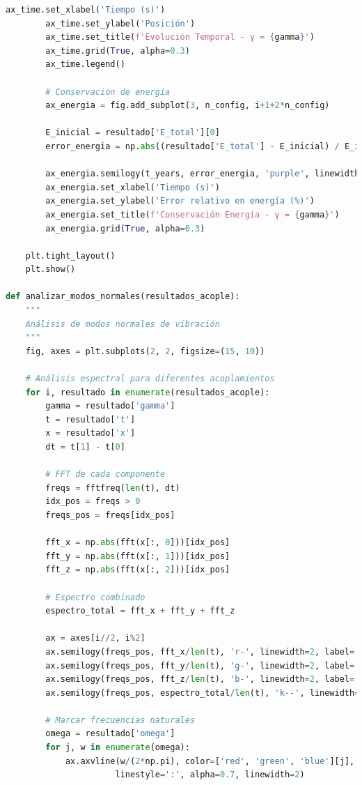 \documentclass{article}
\begin{document}
\begin{lstlisting}[language=Python, caption={Análisis completo de figuras de Lissajous 3D y osciladores acoplados}]
        ax_time.set_xlabel('Tiempo (s)')
        ax_time.set_ylabel('Posición')
        ax_time.set_title(f'Evolución Temporal - γ = {gamma}')
        ax_time.grid(True, alpha=0.3)
        ax_time.legend()
        
        # Conservación de energía
        ax_energia = fig.add_subplot(3, n_config, i+1+2*n_config)
        
        E_inicial = resultado['E_total'][0]
        error_energia = np.abs((resultado['E_total'] - E_inicial) / E_inicial) * 100
        
        ax_energia.semilogy(t_years, error_energia, 'purple', linewidth=2)
        ax_energia.set_xlabel('Tiempo (s)')
        ax_energia.set_ylabel('Error relativo en energía (%)')
        ax_energia.set_title(f'Conservación Energía - γ = {gamma}')
        ax_energia.grid(True, alpha=0.3)
    
    plt.tight_layout()
    plt.show()

def analizar_modos_normales(resultados_acople):
    """
    Análisis de modos normales de vibración
    """
    fig, axes = plt.subplots(2, 2, figsize=(15, 10))
    
    # Análisis espectral para diferentes acoplamientos
    for i, resultado in enumerate(resultados_acople):
        gamma = resultado['gamma']
        t = resultado['t']
        x = resultado['x']
        dt = t[1] - t[0]
        
        # FFT de cada componente
        freqs = fftfreq(len(t), dt)
        idx_pos = freqs > 0
        freqs_pos = freqs[idx_pos]
        
        fft_x = np.abs(fft(x[:, 0]))[idx_pos]
        fft_y = np.abs(fft(x[:, 1]))[idx_pos]
        fft_z = np.abs(fft(x[:, 2]))[idx_pos]
        
        # Espectro combinado
        espectro_total = fft_x + fft_y + fft_z
        
        ax = axes[i//2, i%2]
        ax.semilogy(freqs_pos, fft_x/len(t), 'r-', linewidth=2, label='Modo X', alpha=0.7)
        ax.semilogy(freqs_pos, fft_y/len(t), 'g-', linewidth=2, label='Modo Y', alpha=0.7)
        ax.semilogy(freqs_pos, fft_z/len(t), 'b-', linewidth=2, label='Modo Z', alpha=0.7)
        ax.semilogy(freqs_pos, espectro_total/len(t), 'k--', linewidth=2, label='Total', alpha=0.5)
        
        # Marcar frecuencias naturales
        omega = resultado['omega']
        for j, w in enumerate(omega):
            ax.axvline(w/(2*np.pi), color=['red', 'green', 'blue'][j], 
                      linestyle=':', alpha=0.7, linewidth=2)
        

\end{lstlisting}
\end{document}
